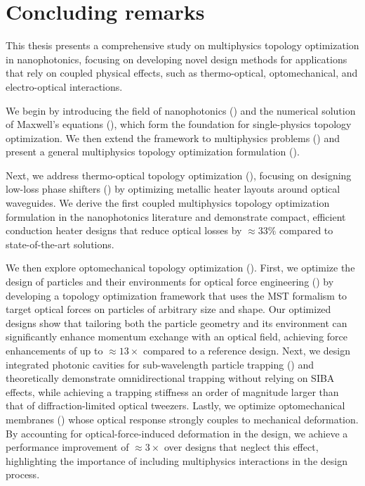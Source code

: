 \chapter{Concluding remarks}

This thesis presents a comprehensive study on multiphysics topology optimization in nanophotonics, focusing on developing novel design
methods for applications that rely on coupled physical effects, such as thermo-optical, optomechanical, and electro-optical interactions.

We begin by introducing the field of nanophotonics () and the numerical solution of Maxwell's equations
(), which form the foundation for single-physics topology optimization. We then extend the framework to multiphysics
problems () and present a general multiphysics topology optimization formulation ().

Next, we address thermo-optical topology optimization (), focusing on designing low-loss phase shifters
 () by optimizing metallic heater layouts around optical waveguides. We derive the first coupled multiphysics topology optimization formulation
in the nanophotonics literature and demonstrate compact, efficient conduction heater designs that reduce optical losses by
$\approx 33\%$ compared to state-of-the-art solutions.

We then explore optomechanical topology optimization (). First, we optimize the design of particles and their environments for optical force engineering () by developing a topology optimization framework that uses the MST formalism to target optical forces on particles of arbitrary size and shape.
Our optimized designs show that tailoring both the particle geometry and its
environment can significantly enhance momentum exchange with an optical field, achieving force enhancements of up to
$\approx 13\times$ compared to a reference design. Next, we design integrated photonic cavities for sub-wavelength particle trapping
() and theoretically demonstrate omnidirectional trapping without relying on SIBA effects, while achieving a trapping stiffness
an order of magnitude larger than that of diffraction-limited optical tweezers. Lastly, we optimize optomechanical membranes
() whose optical response strongly couples to mechanical deformation. By accounting for
optical-force-induced deformation in the design, we achieve a performance improvement of $\approx 3\times$ over designs that
neglect this effect, highlighting the importance of including multiphysics interactions in the design process.

